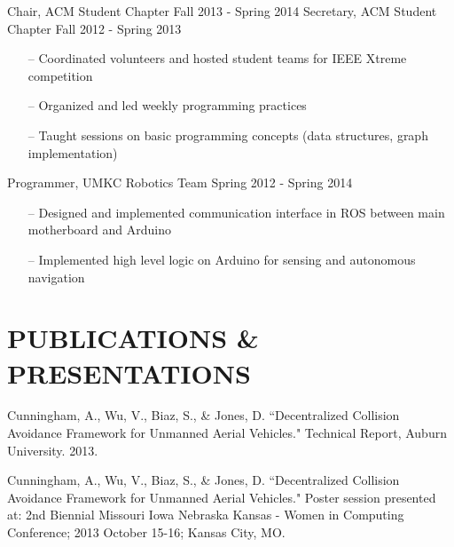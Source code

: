\documentclass[line,margin]{res}
\begin{document}
\begin{resume}
	
		Chair, ACM Student Chapter \hfill Fall 2013 - Spring 2014
		Secretary, ACM Student Chapter \hfill Fall 2012 - Spring 2013 
		         \begin{itemize} [leftmargin=5mm]  \itemsep -2pt %
                 \item[--] Coordinated volunteers and hosted student teams for IEEE Xtreme competition 
                 \item[--] Organized and led weekly programming practices
                 \item[--] Taught sessions on basic programming concepts (data structures, graph implementation)
                 \end{itemize} 

		
		Programmer, UMKC Robotics Team \hfill Spring 2012 - Spring 2014 
		\begin{itemize} [leftmargin=5mm]  \itemsep -2pt %
                 \item[--] Designed and implemented communication interface in ROS between main motherboard and Arduino 
				 \item[--] Implemented high level logic on Arduino for sensing and autonomous navigation %
                 \end{itemize} 
		

\section{PUBLICATIONS \& PRESENTATIONS }

\hangindent=0.7cm Cunningham, A., Wu, V., Biaz, S., \& Jones, D. ``Decentralized Collision Avoidance Framework for Unmanned Aerial Vehicles." Technical Report, Auburn University. 2013.

\hangindent=0.7cm Cunningham, A., Wu, V., Biaz, S., \& Jones, D. ``Decentralized Collision Avoidance Framework for Unmanned Aerial Vehicles." Poster session presented at: 2nd Biennial Missouri Iowa Nebraska Kansas - Women in Computing Conference; 2013 October 15-16; Kansas City, MO.
		


\end{resume}
\end{document}
